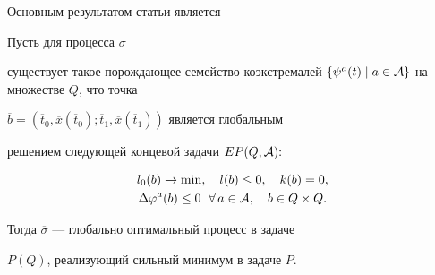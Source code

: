 Основным результатом статьи является





\begin{thm}


Пусть для процесса $\overline{\sigma}$


существует такое порождающее семейство коэкстремалей $\{\psi^a


(t)\mid a\in {\cal A}\}$ на множестве $Q$, что точка


$\overline{b}=(\overline{t}_0, \overline{x}(\overline{t}_0);


\overline{t}_1, \overline{x}(\overline{t}_1))$ является глобальным


решением следующей концевой задачи $EP(Q, {\cal A}){:}$


\begin{gather*}


l_0 (b)\rightarrow\min, \quad l(b)\leq 0, \quad k(b)=0,\\


\Delta\varphi^a (b)\leq 0 \ \; \forall\, a\in {\cal


A}, \quad b\in Q\times Q.


\end{gather*}


Тогда $\overline{\sigma}$ --- глобально оптимальный процесс в задаче


$P(Q)$, реализующий сильный минимум в задаче $P$.


\end{thm}






